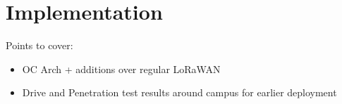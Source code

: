 \section{Implementation}
\label{sec:implementation}

{\color{blue} Points to cover:

\begin{itemize}
    \item OC Arch + additions over regular LoRaWAN
    \item Drive and Penetration test results around campus for earlier deployment
\end{itemize}

}
